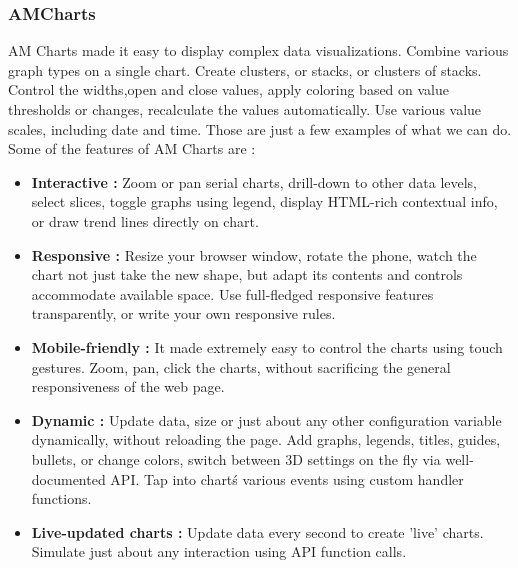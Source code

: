 \subsubsection{AMCharts}
AM Charts made it easy to display complex data visualizations. Combine various graph types on a single chart. Create clusters, or stacks, or clusters of stacks. Control the widths,open and close values, apply coloring based on value thresholds or changes, recalculate the values automatically. Use various value scales, including date and time. Those are just a few examples of what we can do. Some of the features of AM Charts are :
\begin{itemize}
	\item \textbf{Interactive :} Zoom or pan serial charts, drill-down to other data levels, select slices, toggle graphs using legend, display HTML-rich contextual info, or draw trend lines directly on chart.
	\item \textbf{Responsive :} Resize your browser window, rotate the phone, watch the chart not just take the new shape, but adapt its contents and controls accommodate available space. Use full-fledged responsive features transparently, or write your own responsive rules.
	\item \textbf{Mobile-friendly :} It made extremely easy to control the charts using touch gestures. Zoom, pan, click the charts, without sacrificing the general responsiveness of the web page.
	\item \textbf{Dynamic :} Update data, size or just about any other configuration variable dynamically, without reloading the page. Add graphs, legends, titles, guides, bullets, or change colors, switch between 3D settings on the fly via well-documented API. Tap into chart\'s various events using custom handler functions.
	\item \textbf{Live-updated charts :} Update data every second to create 'live' charts. Simulate just about any interaction using API function calls.
\end{itemize}